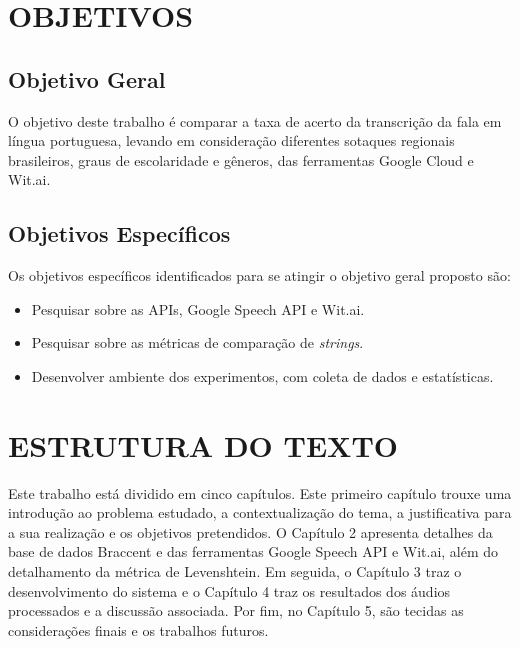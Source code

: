\section{OBJETIVOS}
\subsection{Objetivo Geral}

O objetivo deste trabalho é comparar a taxa de acerto da transcrição da fala em língua portuguesa, levando em consideração diferentes sotaques regionais brasileiros, graus de escolaridade e gêneros, das ferramentas Google Cloud e Wit.ai.

\subsection{Objetivos Específicos}

Os objetivos específicos identificados para se atingir o objetivo geral proposto são:
\begin{itemize}
    \item Pesquisar sobre as APIs, Google Speech API e  Wit.ai.
    \item Pesquisar sobre as métricas de comparação de \textit{strings}.
    \item Desenvolver ambiente dos experimentos, com coleta de dados e estatísticas.
\end{itemize}



\section{ESTRUTURA DO TEXTO}

Este trabalho está dividido em cinco capítulos. Este primeiro capítulo trouxe uma introdução ao problema estudado, a contextualização do tema, a justificativa para a sua realização e os objetivos pretendidos.  O Capítulo 2 apresenta detalhes da base de dados Braccent e das ferramentas Google Speech API e  Wit.ai, além do detalhamento da métrica de Levenshtein. Em seguida, o Capítulo 3 traz o desenvolvimento do sistema e o Capítulo 4 traz os resultados dos áudios processados e a discussão associada. Por fim, no Capítulo 5, são tecidas as considerações finais e os trabalhos futuros.

